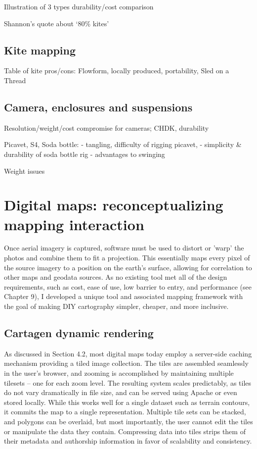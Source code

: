 \documentclass[11pt]{report}
\begin{document}
Illustration of 3 types durability/cost comparison

Shannon's quote about `80\% kites'

\subsection{Kite mapping}

Table of kite pros/cons: Flowform, locally produced, portability, Sled on a Thread

\subsection{Camera, enclosures and suspensions}

Resolution/weight/cost compromise for cameras; CHDK, durability

Picavet, S4, Soda bottle: 
- tangling, difficulty of rigging picavet, 
- simplicity \& durability of soda bottle rig
- advantages to swinging

Weight issues

\section{Digital maps: reconceptualizing mapping interaction}

Once aerial imagery is captured, software must be used to distort or 'warp' the photos and combine them to fit a projection. This essentially maps every pixel of the source imagery to a position on the earth's surface, allowing for correlation to other maps and geodata sources. As no existing tool met all of the design requirements, such as cost, ease of use, low barrier to entry, and performance (see Chapter 9), I developed a unique tool and associated mapping framework with the goal of making DIY cartography simpler, cheaper, and more inclusive.

\subsection{Cartagen dynamic rendering}

As discussed in Section 4.2, most digital maps today employ a server-side caching mechanism providing a tiled image collection. The tiles are assembled seamlessly in the user's browser, and zooming is accomplished by maintaining multiple tilesets -- one for each zoom level. The resulting system scales predictably, as tiles do not vary dramatically in file size, and can be served using Apache or even stored locally. While this works well for a single dataset such as terrain contours, it commits the map to a single representation. Multiple tile sets can be stacked, and polygons can be overlaid, but most importantly, the user cannot edit the tiles or manipulate the data they contain. Compressing data into tiles strips them of their metadata and authorship information in favor of scalability and consistency. 
\end{document}

